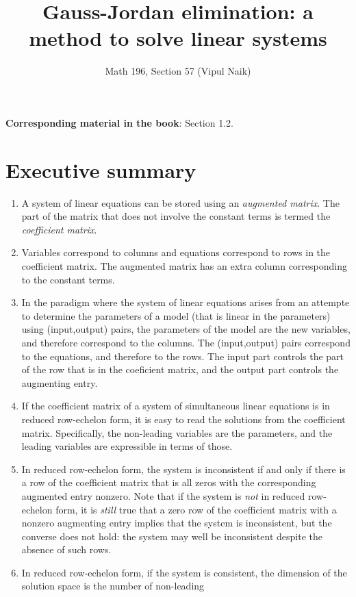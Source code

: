 \documentclass[10pt]{amsart}
\title{Gauss-Jordan elimination: a method to solve linear systems}
\author{Math 196, Section 57 (Vipul Naik)}
\begin{document}
\maketitle

{\bf Corresponding material in the book}: Section 1.2.

\section*{Executive summary}

\begin{enumerate}
\item A system of linear equations can be stored using an {\em
  augmented matrix}. The part of the matrix that does not involve the
  constant terms is termed the {\em coefficient matrix}.
\item Variables correspond to columns and equations correspond to rows
  in the coefficient matrix. The augmented matrix has an extra column
  corresponding to the constant terms.
\item In the paradigm where the system of linear equations arises from
  an attempte to determine the parameters of a model (that is linear
  in the parameters) using (input,output) pairs, the parameters of the
  model are the new variables, and therefore correspond to the
  columns. The (input,output) pairs correspond to the equations, and
  therefore to the rows. The input part controls the part of the row
  that is in the coeficient matrix, and the output part controls the
  augmenting entry.
\item If the coefficient matrix of a system of simultaneous linear
  equations is in reduced row-echelon form, it is easy to read the
  solutions from the coefficient matrix. Specifically, the non-leading
  variables are the parameters, and the leading variables are
  expressible in terms of those.
\item In reduced row-echelon form, the system is inconsistent if and
  only if there is a row of the coefficient matrix that is all zeros
  with the corresponding augmented entry nonzero. Note that if the
  system is {\em not} in reduced row-echelon form, it is {\em still}
  true that a zero row of the coefficient matrix with a nonzero
  augmenting entry implies that the system is inconsistent, but the
  converse does not hold: the system may well be inconsistent despite
  the absence of such rows.
\item In reduced row-echelon form, if the system is consistent, the
  dimension of the solution space is the number of non-leading

\end{enumerate}
\end{document}
